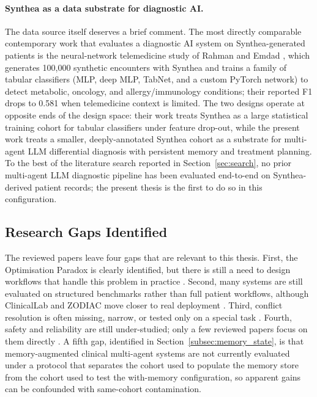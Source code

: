 \paragraph{Synthea as a data substrate for diagnostic AI.}
The data source itself deserves a brief comment. The most directly
comparable contemporary work that evaluates a diagnostic AI system on
Synthea-generated patients is the neural-network telemedicine study
of Rahman and Emdad \cite{Rahman2025SyntheaNN}, which generates
100,000 synthetic encounters with Synthea and trains a family of
tabular classifiers (MLP, deep MLP, TabNet, and a custom PyTorch
network) to detect metabolic, oncology, and allergy/immunology
conditions; their reported F1 drops to 0.581 when telemedicine
context is limited. The two designs operate at opposite ends of the
design space: their work treats Synthea as a large statistical
training cohort for tabular classifiers under feature drop-out,
while the present work treats a smaller, deeply-annotated Synthea
cohort as a substrate for multi-agent LLM differential diagnosis
with persistent memory and treatment planning. To the best of the
literature search reported in Section~\ref{sec:search}, no prior
multi-agent LLM diagnostic pipeline has been evaluated end-to-end on
Synthea-derived patient records; the present thesis is the first to
do so in this configuration.

\FloatBarrier
\subsection{Research Gaps Identified}
\label{subsec:gaps}

The reviewed papers leave four gaps that are relevant to this thesis. First, the
Optimisation Paradox is clearly identified, but there is still a need to design
workflows that handle this problem in practice \cite{Bedi2025OptParadox}.
Second, many systems are still evaluated on structured benchmarks rather than
full patient workflows, although ClinicalLab and ZODIAC move closer to real
deployment \cite{Yan2024ClinicalLab,Zhou2024ZODIAC}. Third, conflict resolution
is often missing, narrow, or tested only on a special task
\cite{Wang2025Catfish,Zhao2025LayeredDebate}. Fourth, safety and reliability are
still under-studied; only a few reviewed papers focus on them directly
\cite{Kim2025TAO,Wu2024EHRFlow,Chen2025MedSentry}. A fifth gap, identified in
Section~\ref{subsec:memory_state}, is that memory-augmented clinical multi-agent
systems are not currently evaluated under a protocol that separates the cohort
used to populate the memory store from the cohort used to test the with-memory
configuration, so apparent gains can be confounded with same-cohort
contamination.

